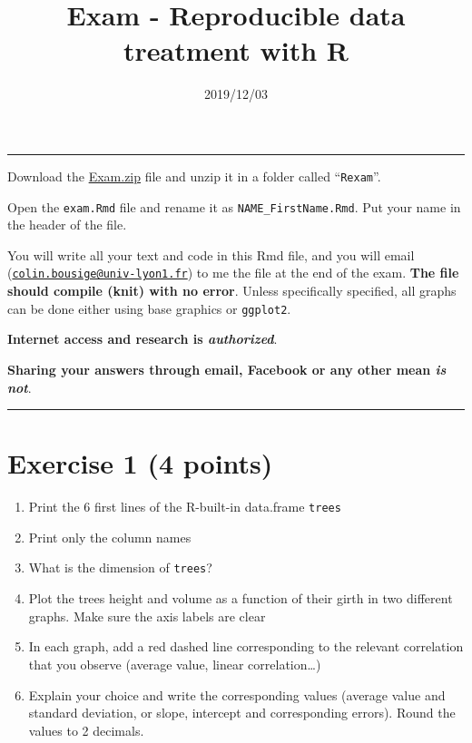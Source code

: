 \documentclass[]{article}
\title{Exam - Reproducible data treatment with R}
\author{}
\date{2019/12/03}
\providecommand{\tightlist}{%
  \setlength{\itemsep}{0pt}\setlength{\parskip}{0pt}}
\begin{document}
\maketitle

\begin{center}\rule{0.5\linewidth}{\linethickness}\end{center}

Download the \href{http://lmi.cnrs.fr/r/Data/Exam.zip}{Exam.zip} file
and unzip it in a folder called ``\texttt{Rexam}''.

Open the \texttt{exam.Rmd} file and rename it as
\texttt{NAME\_FirstName.Rmd}. Put your name in the header of the file.

You will write all your text and code in this Rmd file, and you will
email
(\href{mailto:colin.bousige@univ-lyon1.fr}{\nolinkurl{colin.bousige@univ-lyon1.fr}})
to me the file at the end of the exam. \textbf{The file should compile
(knit) with no error}. Unless specifically specified, all graphs can be
done either using base graphics or \texttt{ggplot2}.

\textbf{Internet access and research is \emph{authorized}}.

\textbf{Sharing your answers through email, Facebook or any other mean
\emph{is not}}.

\begin{center}\rule{0.5\linewidth}{\linethickness}\end{center}

\hypertarget{exercise-1-4-points}{%
\section{Exercise 1 (4 points)}\label{exercise-1-4-points}}

\begin{enumerate}
\def\labelenumi{\arabic{enumi}.}
\tightlist
\item
  Print the 6 first lines of the R-built-in data.frame \texttt{trees}
\item
  Print only the column names
\item
  What is the dimension of \texttt{trees}?
\item
  Plot the trees height and volume as a function of their girth in two
  different graphs. Make sure the axis labels are clear
\item
  In each graph, add a red dashed line corresponding to the relevant
  correlation that you observe (average value, linear
  correlation\ldots{})
\item
  Explain your choice and write the corresponding values (average value
  and standard deviation, or slope, intercept and corresponding errors).
  Round the values to 2 decimals.
\end{enumerate}
\end{document}
